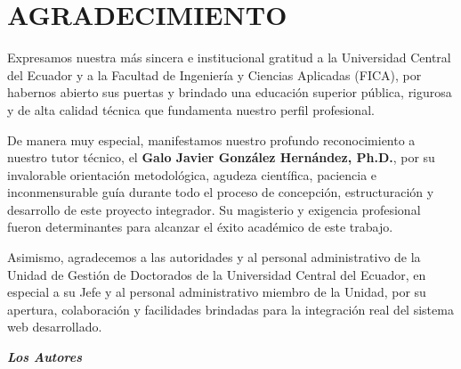 
\pagestyle{empty}
\onehalfspacing
\fontsize{12}{18}\selectfont

\section*{AGRADECIMIENTO}

\vspace{1.5cm}

Expresamos nuestra más sincera e institucional gratitud a la Universidad Central del Ecuador y a la Facultad de Ingeniería y Ciencias Aplicadas (FICA), por habernos abierto sus puertas y brindado una educación superior pública, rigurosa y de alta calidad técnica que fundamenta nuestro perfil profesional.

De manera muy especial, manifestamos nuestro profundo reconocimiento a nuestro tutor técnico, el \textbf{Galo Javier González Hernández, Ph.D.}, por su invalorable orientación metodológica, agudeza científica, paciencia e inconmensurable guía durante todo el proceso de concepción, estructuración y desarrollo de este proyecto integrador. Su magisterio y exigencia profesional fueron determinantes para alcanzar el éxito académico de este trabajo.

Asimismo, agradecemos a las autoridades y al personal administrativo de la Unidad de Gestión de Doctorados de la Universidad Central del Ecuador, en especial a su Jefe y al personal administrativo miembro de la Unidad, por su apertura, colaboración y facilidades brindadas para la integración real del sistema web desarrollado.

\vspace{2.5cm}

\begin{flushright}
\itshape
\textbf{Los Autores}
\end{flushright}

\newpage
